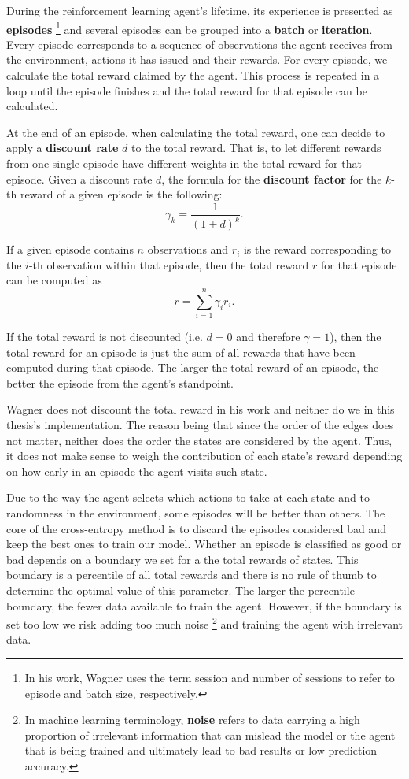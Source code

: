 \documentclass[11pt]{article}
\theoremstyle{definition}
\begin{document}
During the reinforcement learning agent's lifetime, its experience is presented as \textbf{episodes} \footnote{In his work, Wagner uses the term session and number of sessions to refer to episode and batch size, respectively.} and several episodes can be grouped into a \textbf{batch} or \textbf{iteration}. Every episode corresponds to a sequence of observations the agent receives from the environment, actions it has issued and their rewards. For every episode, we calculate the total reward claimed by the agent.
This process is repeated in a loop until the episode finishes and the total reward for that episode can be calculated.

At the end of an episode, when calculating the total reward, one can decide to apply a \textbf{discount rate} $d$ to the total reward. That is, to let different rewards from one single episode have different weights in the total reward for that episode. Given a discount rate $d$, the formula for the \textbf{discount factor} for the $k$-th reward of a given episode is the following: 
\begin{equation*}
    \gamma_k = \frac{1}{(1+d)^k}.
\end{equation*}

If a given episode contains $n$ observations and $r_i$ is the reward corresponding to the $i$-th observation within that episode, then the total reward $r$ for that episode can be computed as
\begin{equation*}
    r = \sum_{i=1}^{n} \gamma_i r_i.
\end{equation*}

If the total reward is not discounted (i.e. $d=0$ and therefore $\gamma = 1$), then the total reward for an episode is just the sum of all rewards that have been computed during that episode. The larger the total reward of an episode, the better the episode from the agent's standpoint. 

Wagner does not discount the total reward in his work and neither do we in this thesis's implementation. The reason being that since the order of the edges does not matter, neither does the order the states are considered by the agent. Thus, it does not make sense to weigh the contribution of each state's reward depending on how early in an episode the agent visits such state.

Due to the way the agent selects which actions to take at each  state and to randomness in the environment, some episodes will be better than others. The core of the cross-entropy method is to discard the episodes considered bad and keep the best ones to train our model. Whether an episode is classified as good or bad depends on a boundary we set for a the total rewards of states. This boundary is a percentile of all total rewards and there is no rule of thumb to determine the optimal value of this parameter. The larger the percentile boundary, the fewer data available to train the agent. However, if the boundary is set too low we risk adding too much noise \footnote{In machine learning terminology, \textbf{noise} refers to data carrying a high proportion of irrelevant information that can mislead the model or the agent that is being trained and ultimately lead to bad results or low prediction accuracy.} and training the agent with irrelevant data. 
\end{document}
